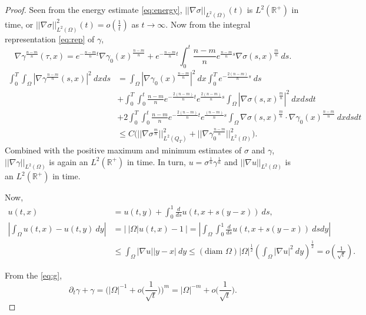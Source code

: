 \documentclass[a4paper,11pt]{article}
\theoremstyle{remark}
\begin{document}
\begin{proof}
 Seen from the energy estimate \eqref{eq:energy}, $||\nabla\sigma||_{L^2(\Omega)}(t)$ is $L^2( \mathbb{R}^+)$ in time, or $||\nabla\sigma||^2_{L^2(\Omega)}(t) = o(\frac{1}{t})$ as $t \rightarrow \infty$. Now from the integral representation \eqref{eq:rep} of $\gamma$, 
 $$ \nabla\gamma^{\frac{n-m}{n}}(\tau,x) = e^{-\frac{n-m}{n}t}\nabla\gamma_0(x)^{\frac{n-m}{n}} + e^{-\frac{n-m}{n}t}\int_0^t \frac{n-m}{n} e^{\frac{n-m}{n}s} \nabla\sigma(s,x)^{\frac{m}{n}} \: ds.$$
 \begin{align*}
  \int_0^T \int_\Omega \left|\nabla\gamma^{\frac{n-m}{n}}(s,x)\right|^2 \: dxds &= \int_\Omega \left|\nabla\gamma_0(x)^{\frac{n-m}{n}}\right|^2 \: dx \int_0^T e^{-\frac{2(n-m)}{n}s}\:ds \\
  &+ \int_0^T \int_0^t \frac{n-m}{n} e^{-\frac{2(n-m)}{n}t}e^{\frac{2(n-m)}{n}s} \int_\Omega\left|\nabla\sigma(s,x)^{\frac{m}{n}}\right|^2 \: dxdsdt\\
  &+ 2\int_0^T \int_0^t \frac{n-m}{n} e^{-\frac{2(n-m)}{n}t}e^{\frac{(n-m)}{n}s} \int_\Omega \nabla\sigma(s,x)^{\frac{m}{n}}\cdot\nabla\gamma_0(x)^{\frac{n-m}{n}} \: dxdsdt\\
  &\le C\Big(||\nabla\sigma^{\frac{m}{n}}||_{L^2(Q_T)}^2 + ||\nabla\gamma_0^{\frac{n-m}{n}}||_{L^2(\Omega)}^2\Big).
 \end{align*}
 Combined with the positive maximum and minimum estimates of $\sigma$ and $\gamma$, $||\nabla\gamma||_{L^2(\Omega)}$ is again an $L^2( \mathbb{R}^+)$ in time. In turn, $u=\sigma^{\frac{1}{n}}\gamma^{\frac{1}{n}}$ and $||\nabla u||_{L^2(\Omega)}$ is  an $L^2( \mathbb{R}^+)$ in time.

 Now, 
 \begin{align*}
  u(t,x) &= u(t,y) + \int_0^1 \frac{d}{ds} u(t,x + s(y-x))\: ds,\\
  \left|\int_\Omega u(t,x) -u(t,y) \: dy\right| &= \Big| ~|\Omega|u(t,x) -1~\Big| = \left|\int_\Omega \int_0^1 \frac{d}{ds} u(t,x + s(y-x))\: dsdy\right|\\
  &\le\int_\Omega |\nabla u||y-x| \: dy \le (\textrm{diam }\Omega)|\Omega|^{\frac{1}{2}} \left( \int_\Omega |\nabla u|^2 \: dy\right)^{\frac{1}{2}} = o(\frac{1}{\sqrt{t}}).
 \end{align*}
 
 From the \eqref{eq:g},
 $$ \partial_t \gamma + \gamma = \Big(|\Omega|^{-1} + o\big(\frac{1}{\sqrt{t}}\big)\Big)^m = |\Omega|^{-m} + o\big(\frac{1}{\sqrt{t}}\big).$$

\end{proof}
\end{document}
